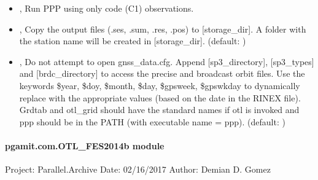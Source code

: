 \documentclass[letterpaper,10pt,english]{sphinxmanual}
\begin{document}
\begin{itemize}
\item {} 
\sphinxAtStartPar
{\hyperref[\detokenize{pgamit.com:LocateRinex.py--code}]{}}, {\hyperref[\detokenize{pgamit.com:LocateRinex.py---code_only}]{}} \sphinxhyphen{} Run PPP using only code (C1) observations.

\item {} 
\sphinxAtStartPar
{\hyperref[\detokenize{pgamit.com:LocateRinex.py--c}]{}} , {\hyperref[\detokenize{pgamit.com:LocateRinex.py---copy_results}]{}}  \sphinxhyphen{} Copy the output files (.ses, .sum, .res, .pos) to {[}storage\_dir{]}. A folder with the station name will be created in {[}storage\_dir{]}. (default: )

\item {} 
\sphinxAtStartPar
{\hyperref[\detokenize{pgamit.com:LocateRinex.py--nocfg}]{}} , {\hyperref[\detokenize{pgamit.com:LocateRinex.py---no_config_file}]{}}  \sphinxhyphen{} Do not attempt to open gnss\_data.cfg. Append {[}sp3\_directory{]}, {[}sp3\_types{]} and {[}brdc\_directory{]} to access the precise and broadcast orbit files. Use the keywords \$year, \$doy, \$month, \$day, \$gpsweek, \$gpswkday to dynamically replace with the appropriate values (based on the date in the RINEX file). Grdtab and otl\_grid should have the standard names if \sphinxhyphen{}otl is invoked and ppp should be in the PATH (with executable name = ppp). (default: )

\end{itemize}


\paragraph{pgamit.com.OTL\_FES2014b module}
\label{\detokenize{pgamit.com:module-pgamit.com.OTL_FES2014b}}\label{\detokenize{pgamit.com:pgamit-com-otl-fes2014b-module}}
\sphinxAtStartPar
Project: Parallel.Archive
Date: 02/16/2017
Author: Demian D. Gomez
\end{document}
